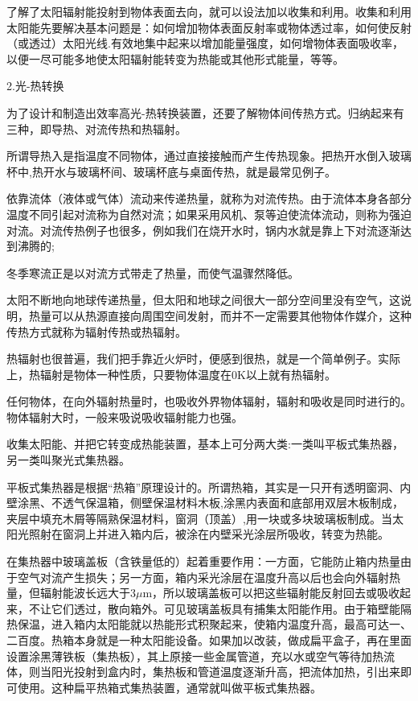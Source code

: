 \documentclass{ctexbook}
\begin{document}
了解了太阳辐射能投射到物体表面去向，就可以设法加以收集和利用。收集和利用太阳能先要解决基本问题是：如何增加物体表面反射率或物体透过率，如何使反射（或透过）太阳光线.有效地集中起来以增加能量强度，如何增物体表面吸收率，以便一尽可能多地使太阳辐射能转变为热能或其他形式能量，等等。

2.光-热转换

为了设计和制造出效率高光-热转换装置，还要了解物体间传热方式。归纳起来有三种，即导热、对流传热和热辐射。

所谓导热入是指温度不同物体，通过直接接触而产生传热现象。把热开水倒入玻璃杯中,热开水与玻璃杯间、玻璃杯底与桌面传热，就是最常见例子。

依靠流体（液体或气体）流动来传递热量，就称为对流传热。由于流体本身各部分温度不同引起对流称为自然对流；如果采用风机、泵等迫使流体流动，则称为强迫对流。对流传热例子也很多，例如我们在烧开水时，锅内水就是靠上下对流逐渐达到沸腾的;

冬季寒流正是以对流方式带走了热量，而使气温骤然降低。

太阳不断地向地球传递热量，但太阳和地球之间很大一部分空间里没有空气，这说明，热量可以从热源直接向周围空间发射，而并不一定需要其他物体作媒介，这种传热方式就称为辐射传热或热辐射。

热辐射也很普遍，我们把手靠近火炉时，便感到很热，就是一个简单例子。实际上，热辐射是物体一种性质，只要物体温度在0K以上就有热辐射。

任何物体，在向外辐射热量时，也吸收外界物体辐射，辐射和吸收是同时进行的。物体辐射大时，一般来吸说吸收辐射能力也强。

收集太阳能、并把它转变成热能装置，基本上可分两大类:一类叫平板式集热器，另一类叫聚光式集热器。

平板式集热器是根据“热箱”原理设计的。所谓热箱，其实是一只开有透明窗洞、内壁涂黑、不透气保温箱，侧壁保温材料木板,涂黑内表面和底部用双层木板制成，夹层中填充木屑等隔熟保温材料，窗洞（顶盖）,用一块或多块玻璃板制成。当太阳光照射在窗洞上并进入箱内后，被涂在内壁采光涂层所吸收，转变为热能。

在集热器中玻璃盖板（含铁量低的）起着重要作用：一方面，它能防止箱内热量由于空气对流产生损失；另一方面，箱内采光涂层在温度升高以后也会向外辐射热量，但辐射能波长远大于3$\mu$m，所以玻璃盖板可以把这些辐射能反射回去或吸收起来，不让它们透过，散向箱外。可见玻璃盖板具有捕集太阳能作用。由于箱壁能隔热保温，进入箱内太阳能就以热能形式积聚起来，使箱内温度升高，最高可达一、二百度。热箱本身就是一种太阳能设备。如果加以改装，做成扁平盒子，再在里面设置涂黑薄铁板（集热板），其上原接一些金属管道，充以水或空气等待加热流体，则当阳光投射到盒内时，集热板和管道温度逐渐升高，把流体加热，引出来即可使用。这种扁平热箱式集热装置，通常就叫做平板式集热器。
\end{document}
